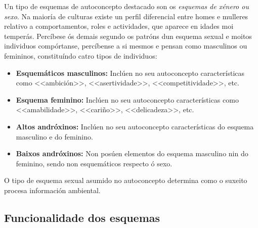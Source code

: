 \documentclass[a4paper,11pt]{article}
\begin{document}
\begin{itemize}
	Un tipo de esquemas de autoconcepto destacado son os \textit{esquemas de xénero ou sexo}. Na 
	maioría de culturas existe un perfil diferencial entre homes e mulleres relativo a 
	comportamentos, roles e actividades, que aparece en idades moi temperás. Percíbese ós demais 
	segundo os patróns dun esquema sexual e moitos individuos compórtanse, percíbense a si mesmos e 
	pensan como masculinos ou femininos, constituíndo catro tipos de individuos:
	\begin{itemize}
		\item \textbf{Esquemáticos masculinos:} Inclúen no seu autoconcepto características como 
		<<ambición>>, <<asertividade>>, <<competitividade>>, etc.
		\item \textbf{Esquema feminino:} Inclúen no seu autoconcepto características como 
		<<amabilidade>>, <<cariño>>, <<delicadeza>>, etc.
		\item \textbf{Altos andróxinos:} Inclúen no seu autoconcepto características do esquema 
		masculino e do feminino.
		\item \textbf{Baixos andróxinos:} Non posúen elementos do esquema masculino nin do 
		feminino, sendo non esquemáticos respecto ó sexo. 
	\end{itemize}
	
	O tipo de esquema sexual asumido no autoconcepto determina como o suxeito procesa información 
	ambiental. 
\end{itemize}

\subsection{Funcionalidade dos esquemas}
\end{document}
